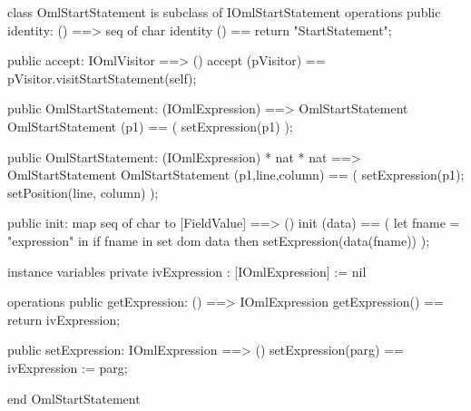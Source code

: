 \begin{vdm_al}
class OmlStartStatement is subclass of IOmlStartStatement
operations
  public identity: () ==> seq of char
  identity () == return "StartStatement";

  public accept: IOmlVisitor ==> ()
  accept (pVisitor) == pVisitor.visitStartStatement(self);

  public OmlStartStatement:
    (IOmlExpression) ==> OmlStartStatement
  OmlStartStatement (p1) == 
    ( setExpression(p1) );

  public OmlStartStatement:
    (IOmlExpression) *
    nat *
    nat ==> OmlStartStatement
  OmlStartStatement (p1,line,column) == 
    ( setExpression(p1);
      setPosition(line, column) );

  public init: map seq of char to [FieldValue] ==> ()
  init (data) ==
    ( let fname = "expression" in
        if fname in set dom data
        then setExpression(data(fname)) );

instance variables
  private ivExpression : [IOmlExpression] := nil

operations
  public getExpression: () ==> IOmlExpression
  getExpression() == return ivExpression;

  public setExpression: IOmlExpression ==> ()
  setExpression(parg) == ivExpression := parg;

end OmlStartStatement
\end{vdm_al}

